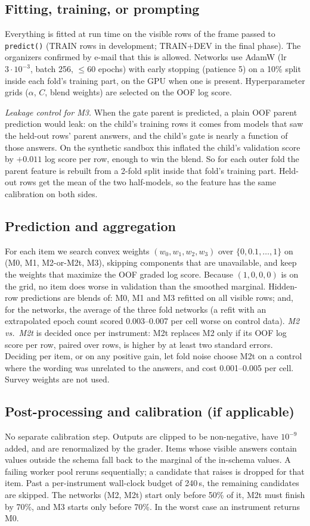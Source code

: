 \documentclass{article}
\begin{document}
\subsection{Fitting, training, or prompting}
Everything is fitted at run time on the visible rows of the frame passed to \texttt{predict()} (TRAIN rows in development; TRAIN+DEV in the final phase). The organizers confirmed by e-mail that this is allowed. Networks use AdamW \citep{loshchilov2019decoupled} (lr $3\cdot10^{-3}$, batch 256, $\le$60 epochs) with early stopping (patience 5) on a 10\% split inside each fold's training part, on the GPU when one is present. Hyperparameter grids ($\alpha$, $C$, blend weights) are selected on the OOF log score.

\emph{Leakage control for M3.} When the gate parent is predicted, a plain OOF parent prediction would leak: on the child's training rows it comes from models that saw the held-out rows' parent answers, and the child's gate is nearly a function of those answers. On the synthetic sandbox this inflated the child's validation score by $+0.011$ log score per row, enough to win the blend. So for each outer fold the parent feature is rebuilt from a 2-fold split inside that fold's training part. Held-out rows get the mean of the two half-models, so the feature has the same calibration on both sides.

\subsection{Prediction and aggregation}
\label{sec:agg}
For each item we search convex weights $(w_0,w_1,w_2,w_3)$ over $\{0,0.1,\dots,1\}$ on (M0, M1, M2-or-M2t, M3), skipping components that are unavailable, and keep the weights that maximize the OOF graded log score. Because $(1,0,0,0)$ is on the grid, no item does worse in validation than the smoothed marginal. Hidden-row predictions are blends of: M0, M1 and M3 refitted on all visible rows; and, for the networks, the average of the three fold networks (a refit with an extrapolated epoch count scored 0.003--0.007 per cell worse on control data). \emph{M2 vs.\ M2t} is decided once per instrument: M2t replaces M2 only if its OOF log score per row, paired over rows, is higher by at least two standard errors. Deciding per item, or on any positive gain, let fold noise choose M2t on a control where the wording was unrelated to the answers, and cost 0.001--0.005 per cell. Survey weights are not used.

\subsection{Post-processing and calibration (if applicable)}
No separate calibration step. Outputs are clipped to be non-negative, have $10^{-9}$ added, and are renormalized by the grader. Items whose visible answers contain values outside the schema fall back to the marginal of the in-schema values. A failing worker pool reruns sequentially; a candidate that raises is dropped for that item. Past a per-instrument wall-clock budget of 240\,s, the remaining candidates are skipped. The networks (M2, M2t) start only before 50\% of it, M2t must finish by 70\%, and M3 starts only before 70\%. In the worst case an instrument returns M0.
\end{document}
